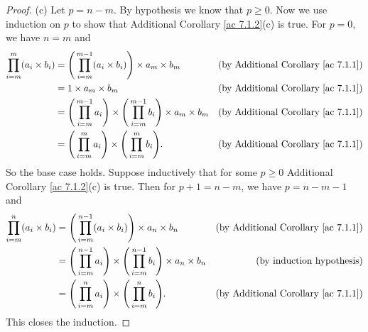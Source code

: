 \begin{proof}{(c)}
    Let \(p = n - m\).
    By hypothesis we know that \(p \geq 0\).
    Now we use induction on \(p\) to show that Additional Corollary \ref{ac 7.1.2}(c) is true.
    For \(p = 0\), we have \(n = m\) and
    \begin{align*}
        \prod_{i = m}^m (a_i \times b_i) & = \Bigg(\prod_{i = m}^{m - 1} (a_i \times b_i)\Bigg) \times a_m \times b_m                                 & \text{(by Additional Corollary \ref{ac 7.1.1})} \\
                                         & = 1 \times a_m \times b_m                                                                                  & \text{(by Additional Corollary \ref{ac 7.1.1})} \\
                                         & = \Bigg(\prod_{i = m}^{m - 1} a_i\Bigg) \times \Bigg(\prod_{i = m}^{m - 1} b_i\Bigg) \times a_m \times b_m & \text{(by Additional Corollary \ref{ac 7.1.1})} \\
                                         & = \Bigg(\prod_{i = m}^m a_i\Bigg) \times \Bigg(\prod_{i = m}^m b_i\Bigg).                                  & \text{(by Additional Corollary \ref{ac 7.1.1})}
    \end{align*}
    So the base case holds.
    Suppose inductively that for some \(p \geq 0\) Additional Corollary \ref{ac 7.1.2}(c) is true.
    Then for \(p + 1 = n - m\), we have \(p = n - m - 1\) and
    \begin{align*}
        \prod_{i = m}^n (a_i \times b_i) & = \Bigg(\prod_{i = m}^{n - 1} (a_i \times b_i)\Bigg) \times a_n \times b_n                                 & \text{(by Additional Corollary \ref{ac 7.1.1})} \\
                                         & = \Bigg(\prod_{i = m}^{n - 1} a_i\Bigg) \times \Bigg(\prod_{i = m}^{n - 1} b_i\Bigg) \times a_n \times b_n & \text{(by induction hypothesis)}                \\
                                         & = \Bigg(\prod_{i = m}^n a_i\Bigg) \times \Bigg(\prod_{i = m}^n b_i\Bigg).                                  & \text{(by Additional Corollary \ref{ac 7.1.1})}
    \end{align*}
    This closes the induction.
\end{proof}


